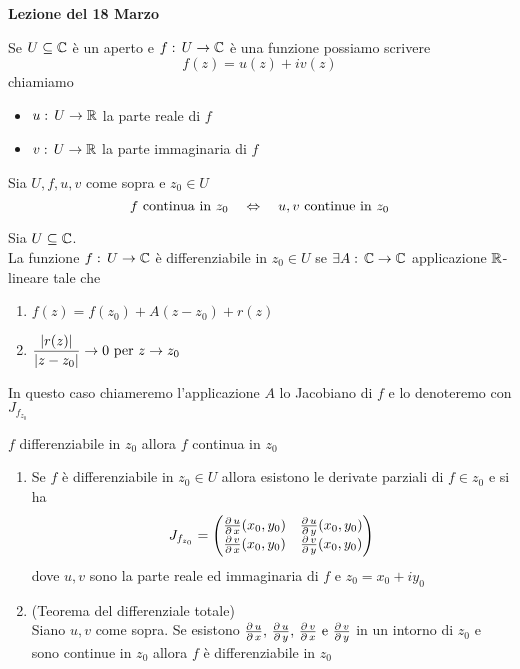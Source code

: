 

\textbf{Lezione del 18  Marzo}
\begin{defn}Se $U\subseteq \mathbb{C}$ \`e un aperto e $f:\, U \to \mathbb{C}$ \`e una funzione possiamo scrivere 
$$f(z)=u(z)+iv(z)$$
chiamiamo 
\begin{itemize}
\item $u:\, U \to \mathbb{R}$ la parte reale di $f$ 
\item $v:\, U \to \mathbb{R}$ la parte immaginaria di $f$ 
\end{itemize}
\end{defn}
\begin{fatto}Sia $U,f,u,v$ come sopra e $z_0\in U$
$$ f \text{ continua in } z_0 \quad \Leftrightarrow \quad u,v\text{ continue in } z_0 $$
\end{fatto}
\begin{defn}Sia $U \subseteq \mathbb{C}$.\\
La funzione $f:\, U \to \mathbb{C}$ \`e differenziabile in $z_0 \in U$ se $\exists A:\, \mathbb{C} \to \mathbb{C}$ applicazione $\mathbb{R}$-lineare tale che 
\begin{enumerate}
\item $f(z)=f(z_0)+A(z-z_0)+r(z)$
\item $\displaystyle \frac{\left\vert r(z) \right\vert}{\left\vert z-z_0 \right\vert} \to 0  \text{ per } z \to z_0$
\end{enumerate}
In questo caso chiameremo l'applicazione $A$ lo Jacobiano di $f$ e lo denoteremo con $J_{f_{z_0}}$ 
\end{defn}
\begin{oss}$f$ differenziabile in $z_0$ allora $f$ continua in $z_0$
\end{oss}
\begin{fatti}\bbianco
\begin{enumerate}
\item Se $f$ \`e differenziabile in $z_0\in U$ allora esistono le derivate parziali di $f\in z_0$ e si ha 
$$ J_{f_{z_0}} =\begin{pmatrix}
\frac{\partial \, u}{\partial\, x} (x_0,y_0) & \frac{\partial \, u}{\partial\, y} (x_0, y_0) \\
\frac{\partial \, v}{\partial\, x} (x_0,y_0) & \frac{\partial \, v}{\partial\, y} (x_0, y_0) \\
\end{pmatrix}$$ 
dove $u,v$ sono la parte reale ed immaginaria di $f$ e $z_0=x_0+ i y_0$
\item (Teorema del differenziale totale)\\
Siano $u,v$ come sopra. Se esistono $\frac{\partial \, u}{\partial\, x} ,\, \frac{\partial \, u}{\partial\, y},\, \frac{\partial \, v}{\partial\, x} \text{ e } \frac{\partial \, v}{\partial\, y} $ in un intorno di $z_0$ e sono continue in $z_0$ allora $f$ \`e differenziabile in $z_0$
\end{enumerate}
\end{fatti}
